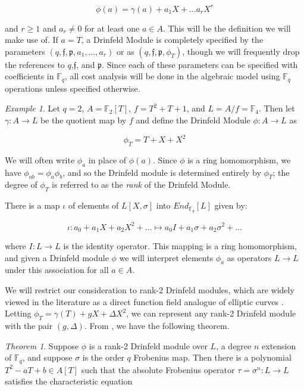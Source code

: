 \documentclass{acmart}
\theoremstyle{remark}
\numberwithin{equation}{section}
\newtheorem{theorem}{Theorem}
\newtheorem{example}{Example}
\newcommand{\frakf}{\mathfrak{f}}
\begin{document}
\[\phi(a) = \gamma(a) + a_1 X + \ldots a_rX^r\]

\noindent and $r \geq 1 $ and $a_r \neq 0$ for at least one $a \in A$. This will be the definition we will make use of. If $a = T$, a Drinfeld Module is completely specified by the parameters $(q,\frakf, \mathfrak{p}, a_1, \ldots, a_r)$ or as $(q,\frakf, \mathfrak{p}, \phi_T)$, though we will frequently drop the references to $q$,$\frakf$, and $\mathfrak{p}$. Since each of these parameters can be specified with coefficients in $\mathbb{F}_q$, all cost analysis will be done in the algebraic model using $\mathbb{F}_q$ operations unless specified otherwise.



\begin{example}
Let $q = 2$, $A = \mathbb{F}_2[T]$, $f = T^2 + T + 1$, and $L = A/f = \mathbb{F}_4$. Then let $\gamma: A \to L$ be the quotient map by $f$ and define the Drinfeld Module $\phi: A \to L$ as

\[ \phi_T = T + X + X^2\]

\end{example}

We will often write $\phi_a$ in place of $\phi(a)$. Since $\phi$ is a ring homomorphism, we have $\phi_{ab} = \phi_a \phi_b$, and so the Drinfeld module is determined entirely by $\phi_T$; the degree of $\phi_T$ is referred to as the \textit{rank} of the Drinfeld Module. 

There is a map $\iota$ of elements of $L[X, \sigma]$ into $End_{\mathbb{F}_q}[L]$ given by:

\[\iota: a_0 + a_1X + a_2X^2 + \ldots \mapsto a_0 I + a_1 \sigma + a_2 \sigma^2 + \ldots \]

\noindent where $I: L \to L$ is the identity operator. This mapping is a ring homomorphism, and given a Drinfeld module $\phi$ we will interpret elements $\phi_a$ as operators $L \to L$ under this association for all $a \in A$.

We will restrict our consideration to rank-2 Drinfeld modules, which are widely viewed in the literature as a direct function field analogue of elliptic curves \cite{GEKELE1991187}. Letting $\phi_T = \gamma(T) + g X + \Delta X^2$, we can represent any rank-2 Drinfeld module with the pair $(g,\Delta)$. From \cite{frobdist}, we have the following theorem. 
\begin{theorem}\label{charpoly}
Suppose $\phi$ is a rank-2 Drinfeld module over $L$, a degree $n$ extension of $\mathbb{F}_q$, and suppose $\sigma$ is the order $q$ Frobenius map. Then there is a polynomial $T^2 -aT + b \in A[T]$ such that the absolute Frobenius operator $\tau = \sigma^n: L \to L$  satisfies the characteristic equation
\end{theorem}
\end{document}
